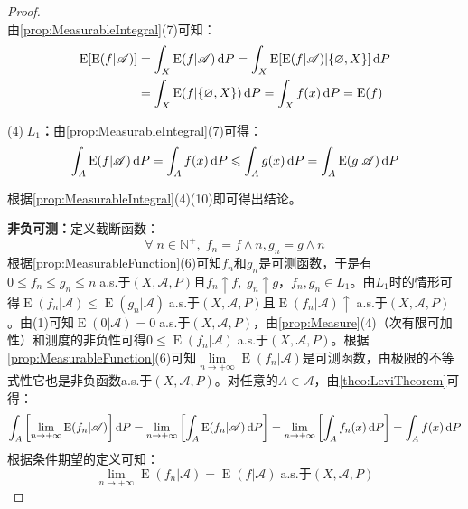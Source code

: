 \begin{proof}
\begin{equation*}
	\end{equation*}
	由\cref{prop:MeasurableIntegral}(7)可知：
	\begin{align*}
		\operatorname{E}[\operatorname{E}(f|\mathscr{A})]&=\int_{X}\operatorname{E}(f|\mathscr{A})\mathop{}\!\mathrm{d} P=\int_{X}\operatorname{E}[\operatorname{E}(f|\mathscr{A})|\{\varnothing,X\}]\mathop{}\!\mathrm{d} P \\
		&=\int_{X}\operatorname{E}(f|\{\varnothing,X\})\mathop{}\!\mathrm{d} P=\int_{X}f(x)\mathop{}\!\mathrm{d} P=\operatorname{E}(f)
	\end{align*}\par
	(4)\textbf{$\;L_1$：}由\cref{prop:MeasurableIntegral}(7)可得：
	\begin{equation*}
		\int_{A}\operatorname{E}(f|\mathscr{A})\mathop{}\!\mathrm{d} P=\int_{A}f(x)\mathop{}\!\mathrm{d} P\leqslant\int_{A}g(x)\mathop{}\!\mathrm{d} P=\int_{A}\operatorname{E}(g|\mathscr{A})\mathop{}\!\mathrm{d} P
	\end{equation*}\par
	根据\cref{prop:MeasurableIntegral}(4)(10)即可得出结论。\par
	\textbf{非负可测：}定义截断函数：
	\begin{equation*}
		\forall\;n\in\mathbb{N}^+,\;f_n=f\wedge n,g_n=g\wedge n
	\end{equation*}
	根据\cref{prop:MeasurableFunction}(6)可知$f_n$和$g_n$是可测函数，于是有$0\leqslant f_n\leqslant g_n\leqslant n\;$a.s.于$(X,\mathscr{A},P)$且$f_n\uparrow f,\;g_n\uparrow g$，$f_n,g_n\in L_1$。由$L_1$时的情形可得$\operatorname{E}(f_n|\mathscr{A})\leqslant\operatorname{E}(g_n|\mathscr{A})\;$a.s.于$(X,\mathscr{A},P)$且$\operatorname{E}(f_n|\mathscr{A})\uparrow\;$a.s.于$(X,\mathscr{A},P)$。由(1)可知$\operatorname{E}(0|\mathscr{A})=0\;$a.s.于$(X,\mathscr{A},P)$，由\cref{prop:Measure}(4)（次有限可加性）和测度的非负性可得$0\leqslant\operatorname{E}(f_n|\mathscr{A})\;$a.s.于$(X,\mathscr{A},P)$。根据\cref{prop:MeasurableFunction}(6)可知$\lim\limits_{n\to+\infty}\operatorname{E}(f_n|\mathscr{A})$是可测函数，由极限的不等式性它也是非负函数a.s.于$(X,\mathscr{A},P)$。对任意的$A\in\mathscr{A}$，由\cref{theo:LeviTheorem}可得：
	\begin{equation*}
		\int_{A}\left[\lim_{n\to+\infty}\operatorname{E}(f_n|\mathscr{A})\right]\mathop{}\!\mathrm{d} P=\lim_{n\to+\infty}\left[\int_{A}\operatorname{E}(f_n|\mathscr{A})\mathop{}\!\mathrm{d} P\right]=\lim_{n\to+\infty}\left[\int_{A}f_n(x)\mathop{}\!\mathrm{d} P\right]=\int_{A}f(x)\mathop{}\!\mathrm{d} P
	\end{equation*}
	根据条件期望的定义可知：
	\begin{equation*}
		\lim_{n\to+\infty}\operatorname{E}(f_n|\mathscr{A})=\operatorname{E}(f|\mathscr{A})\;\text{a.s.于}(X,\mathscr{A},P)

\end{equation*}
\end{proof}
